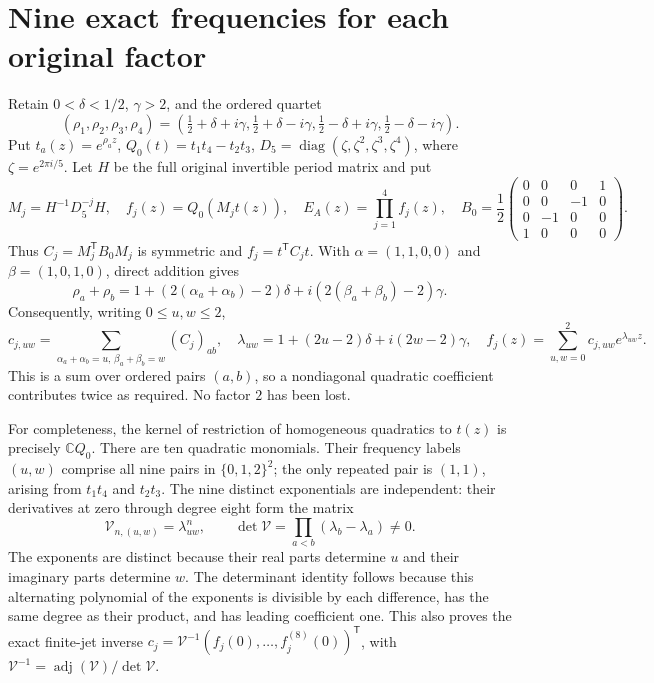 \documentclass[11pt]{article}
\newcommand{\C}{\mathbb C}
\newcommand{\diag}{\operatorname{diag}}
\begin{document}
\section{Nine exact frequencies for each original factor}
Retain $0<\delta<1/2$, $\gamma>2$, and the ordered quartet
\[
 (\rho_1,\rho_2,\rho_3,\rho_4)
 =\left(\tfrac12+\delta+i\gamma,\tfrac12+\delta-i\gamma,
 \tfrac12-\delta+i\gamma,\tfrac12-\delta-i\gamma\right).
 \tag{IR1}
\]
Put $t_a(z)=e^{\rho_a z}$, $Q_0(t)=t_1t_4-t_2t_3$,
$D_5=\diag(\zeta,\zeta^2,\zeta^3,\zeta^4)$, where
$\zeta=e^{2\pi i/5}$. Let $H$ be the full original invertible period
matrix and put
\[
 M_j=H^{-1}D_5^{-j}H,\quad f_j(z)=Q_0(M_jt(z)),\quad
 E_A(z)=\prod_{j=1}^4 f_j(z),\quad
 B_0=\frac12\begin{pmatrix}0&0&0&1\\0&0&-1&0\\
 0&-1&0&0\\1&0&0&0\end{pmatrix}.
 \tag{IR2}
\]
Thus $C_j=M_j^{\mathsf T}B_0M_j$ is symmetric and
$f_j=t^{\mathsf T}C_jt$. With
$\alpha=(1,1,0,0)$ and $\beta=(1,0,1,0)$, direct addition gives
\[
 \rho_a+\rho_b
 =1+(2(\alpha_a+\alpha_b)-2)\delta
     +i(2(\beta_a+\beta_b)-2)\gamma.
\]
Consequently, writing $0\le u,w\le2$,
\[
 c_{j,uw}=\sum_{\alpha_a+\alpha_b=u,\,\beta_a+\beta_b=w}(C_j)_{ab},
 \quad \lambda_{uw}=1+(2u-2)\delta+i(2w-2)\gamma,
 \quad f_j(z)=\sum_{u,w=0}^2c_{j,uw}e^{\lambda_{uw}z}.
 \tag{IR3}
\]
This is a sum over ordered pairs $(a,b)$, so a nondiagonal quadratic
coefficient contributes twice as required. No factor $2$ has been lost.

For completeness, the kernel of restriction of homogeneous quadratics
to $t(z)$ is precisely $\C Q_0$. There are ten quadratic monomials.
Their frequency labels $(u,w)$ comprise all nine pairs in $\{0,1,2\}^2$;
the only repeated pair is $(1,1)$, arising from $t_1t_4$ and $t_2t_3$.
The nine distinct exponentials are independent: their derivatives at
zero through degree eight form the matrix
\[
 \mathcal V_{n,(u,w)}=\lambda_{uw}^n,\qquad
 \det\mathcal V=\prod_{a<b}(\lambda_b-\lambda_a)\ne0.
 \tag{IR4}
\]
The exponents are distinct because their real parts determine $u$ and
their imaginary parts determine $w$. The determinant identity follows
because this alternating polynomial of the exponents is divisible by
each difference, has the same degree as their product, and has leading
coefficient one. This also proves the exact finite-jet inverse
$c_j=\mathcal V^{-1}(f_j(0),\ldots,f_j^{(8)}(0))^{\mathsf T}$, with
$\mathcal V^{-1}=\operatorname{adj}(\mathcal V)/\det\mathcal V$.
\end{document}
